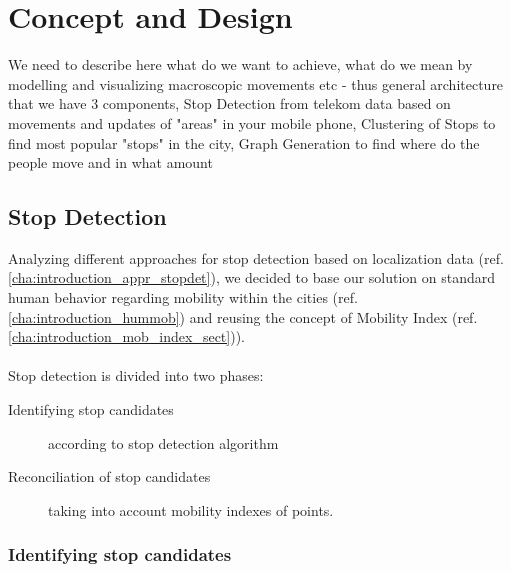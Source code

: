 \chapter{Concept and Design}
\label{cha:conceptanddesign}

We need to describe here what do we want to achieve, what do we mean by modelling and visualizing macroscopic movements etc - thus general architecture that we have 3 components, Stop Detection from telekom data based on movements and updates of "areas" in your mobile phone, Clustering of Stops to find most popular "stops" in the city, Graph Generation to find where do the people move and in what amount

\section{Stop Detection}

Analyzing different approaches for stop detection based on localization data (ref. \autoref{cha:introduction_appr_stopdet}), we decided to base our solution on standard human behavior regarding mobility within the cities (ref. \autoref{cha:introduction_hummob}) and reusing the concept of Mobility Index (ref. \autoref{cha:introduction_mob_index_sect})).
\\
\\
Stop detection is divided into two phases:
\begin{description}
	\item[Identifying stop candidates] according to stop detection algorithm
	\item[Reconciliation of stop candidates] taking into account mobility indexes of points. 
\end{description}

\subsection{Identifying stop candidates}

